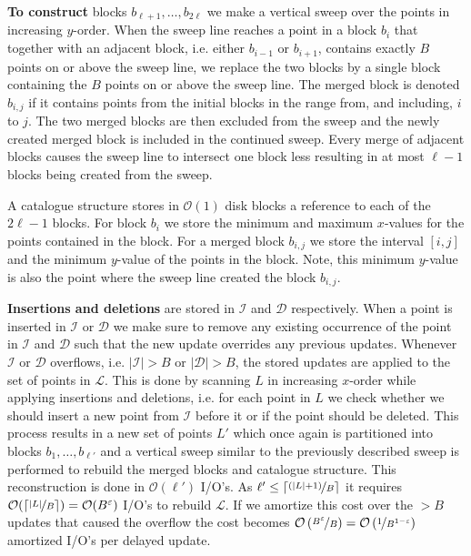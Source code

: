 \documentclass[twoside,11pt,openright]{report}
\def \epsilon {\varepsilon}
\begin{document}
\textbf{To construct} blocks $b_{\ell+1},\dots,b_{2\ell}$ we make a vertical sweep over the points in increasing $y$-order. When the sweep line reaches a point in a block $b_i$ that together with an adjacent block, i.e. either $b_{i-1}$ or $b_{i+1}$, contains exactly $B$ points on or above the sweep line, we replace the two blocks by a single block containing the $B$ points on or above the sweep line.  The merged block is denoted $b_{i,j}$ if it contains points from the initial blocks in the range from, and including, $i$ to $j$. The two merged blocks are then excluded from the sweep and the newly created merged block is included in the continued sweep. Every merge of adjacent blocks causes the sweep line to intersect one block less resulting in at most $\ell-1$ blocks being created from the sweep.

A catalogue structure stores in $\mathcal{O}(1)$ disk blocks a reference to each of the $2\ell-1$ blocks. For block $b_i$ we store the minimum and maximum $x$-values for the points contained in the block. For a merged block $b_{i,j}$ we store the interval $\left[ i,j\right]$ and the minimum $y$-value of the points in the block. Note, this minimum $y$-value is also the point where the sweep line created the block $b_{i,j}$.

\textbf{Insertions and deletions} are stored in $\mathcal{I}$ and $\mathcal{D}$ respectively. When a point is inserted in $\mathcal{I}$ or $\mathcal{D}$ we make sure to remove any existing occurrence of the point in $\mathcal{I}$ and $\mathcal{D}$ such that the new update overrides any previous updates. Whenever $\mathcal{I}$ or $\mathcal{D}$ overflows, i.e. $\vert \mathcal{I} \vert > B$ or $\vert \mathcal{D} \vert > B$, the stored updates are applied to the set of points in $\mathcal{L}$. This is done by scanning $L$ in increasing $x$-order while applying insertions and deletions, i.e. for each point in $L$ we check whether we should insert a new point from $\mathcal{I}$ before it or if the point should be deleted. This process results in a new set of points $L'$ which once again is partitioned into blocks $b_1,\dots,b_{\ell'}$ and a vertical sweep similar to the previously described sweep is performed to rebuild the merged blocks and catalogue structure.
This reconstruction is done in $\mathcal{O}(\ell')$ I/O's. As $\ell' \leq \lceil \nicefrac{(\vert L \vert + 1)}{B}\rceil$ it requires $\mathcal{O}(\lceil \nicefrac{\vert L \vert}{B}\rceil) = \mathcal{O}(B^\epsilon)$ I/O's to rebuild $\mathcal{L}$. If we amortize this cost over the $>B$ updates that caused the overflow the cost becomes $\mathcal{O}\left(\nicefrac{B^\epsilon}{B}\right) = \mathcal{O}\left(\nicefrac{1}{B^{1-\epsilon}}\right)$ amortized I/O's per delayed update.
\end{document}
